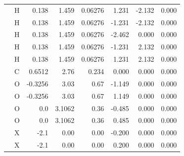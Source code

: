\begin{table}[h]
\begin{centering}
\begin{tabular*}{1\linewidth}{@{\extracolsep{\fill}}llrrrrrr}
 & {\scriptsize{}H} & {\scriptsize{}0.138 } & {\scriptsize{}1.459} & {\scriptsize{}0.06276 } & {\scriptsize{}1.231} & {\scriptsize{}-2.132} & {\scriptsize{}0.000}\tabularnewline
\addlinespace[-0.17em]
\addlinespace[-0.33em]
 & {\scriptsize{}H} & {\scriptsize{}0.138 } & {\scriptsize{}1.459} & {\scriptsize{}0.06276 } & {\scriptsize{}-1.231} & {\scriptsize{}-2.132} & {\scriptsize{}0.000}\tabularnewline
\addlinespace[-0.17em]
\addlinespace[-0.33em]
 & {\scriptsize{}H} & {\scriptsize{}0.138 } & {\scriptsize{}1.459} & {\scriptsize{}0.06276 } & {\scriptsize{}-2.462} & {\scriptsize{}0.000} & {\scriptsize{}0.000}\tabularnewline
\addlinespace[-0.17em]
\addlinespace[-0.33em]
 & {\scriptsize{}H} & {\scriptsize{}0.138 } & {\scriptsize{}1.459} & {\scriptsize{}0.06276 } & {\scriptsize{}-1.231} & {\scriptsize{}2.132} & {\scriptsize{}0.000}\tabularnewline
\addlinespace[-0.17em]
\addlinespace[-0.33em]
 & {\scriptsize{}H} & {\scriptsize{}0.138 } & {\scriptsize{}1.459} & {\scriptsize{}0.06276 } & {\scriptsize{}1.231} & {\scriptsize{}2.132} & {\scriptsize{}0.000}\tabularnewline
\addlinespace[-0.17em]
\midrule 
\addlinespace[-0.33em]
{\scriptsize{}$\mathrm{CO_{2}}$ \citep{Harris_1995}} & {\scriptsize{}C} & {\scriptsize{}0.6512 } & {\scriptsize{}2.76} & {\scriptsize{}0.234} & {\scriptsize{}0.000 } & {\scriptsize{}0.000 } & {\scriptsize{}0.000 }\tabularnewline
\addlinespace[-0.17em]
\addlinespace[-0.33em]
 & {\scriptsize{}O} & {\scriptsize{}-0.3256} & {\scriptsize{}3.03 } & {\scriptsize{}0.67} & {\scriptsize{}-1.149 } & {\scriptsize{}0.000 } & {\scriptsize{}0.000 }\tabularnewline
\addlinespace[-0.17em]
\addlinespace[-0.33em]
 & {\scriptsize{}O} & {\scriptsize{}-0.3256} & {\scriptsize{}3.03 } & {\scriptsize{}0.67} & {\scriptsize{}1.149 } & {\scriptsize{}0.000 } & {\scriptsize{}0.000 }\tabularnewline
\addlinespace[-0.17em]
\midrule 
\addlinespace[-0.33em]
{\scriptsize{}$\mathrm{O_{2}}$ \citep{Boutard200525}} & {\scriptsize{}O} & {\scriptsize{}0.0} & {\scriptsize{}3.1062} & {\scriptsize{}0.36 } & {\scriptsize{}-0.485} & {\scriptsize{}0.000 } & {\scriptsize{}0.000 }\tabularnewline
\addlinespace[-0.17em]
\addlinespace[-0.33em]
 & {\scriptsize{}O} & {\scriptsize{}0.0} & {\scriptsize{}3.1062} & {\scriptsize{}0.36 } & {\scriptsize{}0.485} & {\scriptsize{}0.000 } & {\scriptsize{}0.000 }\tabularnewline
\addlinespace[-0.17em]
\addlinespace[-0.33em]
 & {\scriptsize{}X} & {\scriptsize{}-2.1} & {\scriptsize{}0.00} & {\scriptsize{}0.00} & {\scriptsize{}-0.200} & {\scriptsize{}0.000 } & {\scriptsize{}0.000 }\tabularnewline
\addlinespace[-0.17em]
\addlinespace[-0.33em]
 & {\scriptsize{}X} & {\scriptsize{}-2.1} & {\scriptsize{}0.00} & {\scriptsize{}0.00} & {\scriptsize{}0.200} & {\scriptsize{}0.000 } & {\scriptsize{}0.000 }\tabularnewline

\end{tabular*}
\end{centering}
\end{table}

